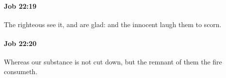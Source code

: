		\paragraph{Job 22:19} %
			\label{JOB-22-19}

			The righteous see it, and are glad: and the innocent laugh them to scorn.


		\paragraph{Job 22:20} %
			\label{JOB-22-20}

			Whereas our substance is not cut down, but the remnant of them the fire consumeth.


